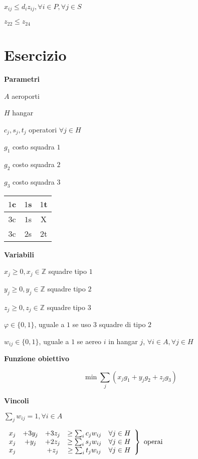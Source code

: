 \documentclass[10pt,a4paper,twoside,openright]{book}
\newcounter{es}
\newcommand{\Es}{
	\stepcounter{es}
	\section{Esercizio \arabic{es}}
	}
\newcommand{\Par}{\textbf{Parametri}}
\newcommand{\Var}{\textbf{Variabili}}
\newcommand{\Fob}{\textbf{Funzione obiettivo}}
\newcommand{\Vin}{\textbf{Vincoli}}
\begin{document}
$x_{ij} \leq d_{i} z_{ij} ,\forall i\in P,\forall j\in S$

$z_{22} \leq z_{24}$

\Es

\Par

$A$ aeroporti

$H$ hangar

$c_{j},s_{j},t_{j}$ operatori $\forall j\in H$

$g_{1}$ costo squadra $1$

$g_{2}$ costo squadra $2$

$g_{3}$ costo squadra $3$

\begin{center}
	
	\begin{tabular}{|c|c|c|}
		\hline 
		$1$c & $1$s & $1$t \\
		\hline 
		$3$c & $1$s & X    \\
		\hline 
		$3$c & $2$s & $2$t \\
		\hline
	\end{tabular}
\end{center}

\Var

$x_{j} \geqslant 0,x_{j} \in \mathbb{Z}$ squadre tipo $1$

$y_{j} \geqslant 0,y_{j} \in \mathbb{Z}$ squadre tipo $2$

$z_{j} \geqslant 0,z_{j} \in \mathbb{Z}$ squadre tipo $3$

$\varphi \in \{0,1\}$, uguale a $1$ se uso 3 squadre di tipo $2$

$w_{ij} \in \{0,1\}$, uguale a $1$ se aereo $i$ in hangar $j$, $\forall i\in A,\forall j\in H$

\Fob

\begin{equation*}
	\min \sum _{j}( x_{j} g_{1} +y_{j} g_{2} +z_{j} g_{3})
\end{equation*}

\Vin

$\sum _{j} w_{ij} =1,\forall i\in A$

$\begin{drcases}
	\begin{array}{ c c c c c }
		x_{j} & +3y_{j} & +3z_{j} & \geq \sum _{i} c_{j} w_{ij} & \forall j\in H \\
		x_{j} & +y_{j}  & +2z_{j} & \geq \sum _{i} s_{j} w_{ij} & \forall j\in H \\
		x_{j} &         & +z_{j}  & \geq \sum _{i} t_{j} w_{ij} & \forall j\in H 
	\end{array}
\end{drcases} \ \text{operai}$
\end{document}

